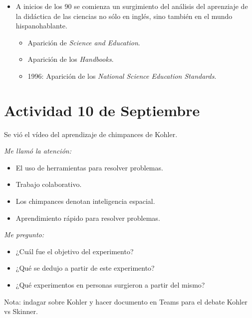 \documentclass[12pt]{report}
\newcounter{it}
\theoremstyle{largebreak}
\begin{document}
\begin{itemize}
        \item A inicios de los 90 se comienza un surgimiento del análisis del aprenziaje de la didáctica de las ciencias no sólo en inglés, sino también en el mundo hispanohablante.
        \begin{itemize}
            \item Aparición de \textit{Science and Education}.
            \item Aparición de los \textit{Handbooks}.
            \item 1996: Aparición de los \textit{National Science Education Standards}.
        \end{itemize}
    \end{itemize}

    \section{Actividad 10 de Septiembre}

    \begin{obs}
        Se vió el vídeo del aprendizaje de chimpances de Kohler.
    \end{obs}

    \textit{Me llamó la atención:}

    \begin{itemize}
        \item El uso de herramientas para resolver problemas.
        \item Trabajo colaborativo.
        \item Los chimpances denotan inteligencia espacial.
        \item Aprendimiento rápido para resolver problemas.
    \end{itemize}
        
    \textit{Me pregunto:}

    \begin{itemize}
        \item ¿Cuál fue el objetivo del experimento?
        \item ¿Qué se dedujo a partir de este experimento?
        \item ¿Qué experimentos en personas surgieron a partir del mismo?
    \end{itemize}

    \begin{obs}
        Nota: indagar sobre Kohler y hacer documento en Teams para el debate Kohler vs Skinner.
    \end{obs}
\end{document}
